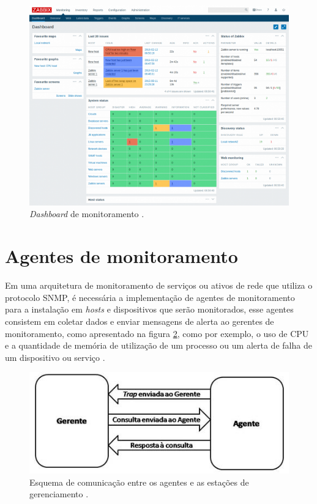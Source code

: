 \begin{enumerate}
\begin{figure}[h!]
	\begin{center}
	\includegraphics[scale = 0.80]{img/dashboard.png}
		\caption{\textit{Dashboard} de monitoramento \cite{zabbix}.}
		\label{fun:fig:zabbix}
	\end{center}
\end{figure}

\end{enumerate}


\section{Agentes de monitoramento}

Em uma arquitetura de monitoramento de serviços ou ativos de rede que utiliza o protocolo \acrshort{SNMP}, é necessária a implementação de agentes de monitoramento para a instalação em \textit{hosts} e dispositivos que serão monitorados, esse agentes consistem em coletar dados e enviar mensagens de alerta ao gerentes de monitoramento, como  apresentado na figura \ref{fun:fig:agente}, como por exemplo, o uso de \acrshort{CPU} e a quantidade de memória de utilização de um processo ou um alerta de falha de um dispositivo ou serviço \cite{7439952}.  

\begin{figure}[h!]
	\begin{center}
	\includegraphics[scale = 0.80]{img/image004.jpg}
		\caption{Esquema de comunicação entre os agentes e as estações de gerenciamento \cite{snmpagentimage}.}
		\label{fun:fig:agente}
	\end{center}
\end{figure}

